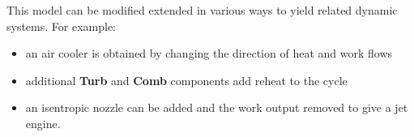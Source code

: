 This model can be modified extended in various ways to yield related
dynamic systems. For example:
\begin{itemize}
\item an air cooler is obtained by changing the direction of heat and
  work flows
\item additional \textbf{Turb} and \textbf{Comb} components add reheat
  to the cycle
\item an isentropic nozzle can be added and the work output removed
  to give a jet engine.
\end{itemize}


